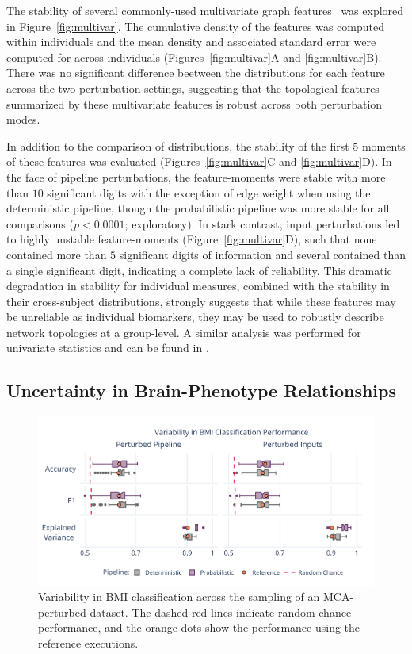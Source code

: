 \documentclass[fleqn,10pt]{SelfArx} %
\begin{document}
The stability of several commonly-used multivariate graph features~\cite{Betzel2018-eo} was explored in
Figure~\ref{fig:multivar}. The cumulative density of the features was computed within individuals and the mean
density and associated standard error were computed for across individuals (Figures~\ref{fig:multivar}A and
\ref{fig:multivar}B). There was no significant difference beetween the distributions for each feature across the two
perturbation settings, suggesting that the topological features summarized by these multivariate features is robust
across both perturbation modes.

In addition to the comparison of distributions, the stability of the first $5$ moments of these features was evaluated
(Figures~\ref{fig:multivar}C and \ref{fig:multivar}D). In the face of pipeline perturbations, the feature-moments were
stable with more than $10$ significant digits with the exception of edge weight when using the deterministic pipeline,
though the probabilistic pipeline was more stable for all comparisons ($p < 0.0001$; exploratory). In stark contrast,
input perturbations led to highly unstable feature-moments (Figure~\ref{fig:multivar}D), such that none contained more
than $5$ significant digits of information and several contained than a single significant digit, indicating a complete
lack of reliability. This dramatic degradation in stability for individual measures, combined with the stability in
their cross-subject distributions, strongly suggests that while these features may be unreliable as individual
biomarkers, they may be used to robustly describe network topologies at a group-level. A similar analysis was performed
for univariate statistics and can be found in .

\subsection*{Uncertainty in Brain-Phenotype Relationships}

\begin{figure}[ht]\centering
\includegraphics[width=0.7\linewidth]{figures/fig3_bmi_classification.pdf}
\caption{Variability in BMI classification across the sampling of an MCA-perturbed dataset. The dashed red lines
indicate random-chance performance, and the orange dots show the performance using the reference executions.}
\label{fig:bmi}
\end{figure}
 
\end{document}
